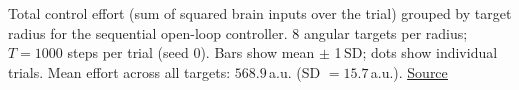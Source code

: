 Total control effort (sum of squared brain inputs over the trial) grouped by target radius for the sequential open-loop controller. 8 angular targets per radius; $T=1000$ steps per trial (seed 0). Bars show mean $\pm$ 1\,SD; dots show individual trials. Mean effort across all targets: $568.9$\,a.u. (SD $= 15.7$\,a.u.). \href{https://github.com/tahmidazam/gg4/blob/main/notebooks/cartesian_control_effort/cartesian_control_effort.ipynb}{\underline{Source}}%